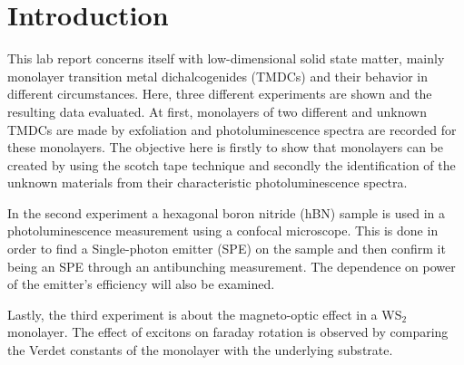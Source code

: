 \section{Introduction}

  This lab report concerns itself with low-dimensional solid state matter, mainly monolayer transition metal dichalcogenides (TMDCs) and their behavior in different circumstances.
  Here, three different experiments are shown and the resulting data evaluated.
  At first, monolayers of two different and unknown TMDCs are made by exfoliation and photoluminescence spectra are recorded for these monolayers.
  The objective here is firstly to show that monolayers can be created by using the scotch tape technique and secondly the identification of the unknown materials from their characteristic photoluminescence spectra.

  In the second experiment a hexagonal boron nitride (hBN) sample is used in a photoluminescence measurement using a confocal microscope.
  This is done in order to find a Single-photon emitter (SPE) on the sample and then confirm it being an SPE through an antibunching measurement.
  The dependence on power of the emitter's efficiency will also be examined.

  Lastly, the third experiment is about the magneto-optic effect in a WS$_2$ monolayer.
  The effect of excitons on faraday rotation is observed by comparing the Verdet constants of the monolayer with the underlying substrate.


